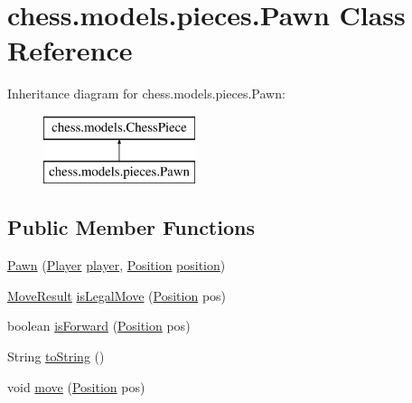 \hypertarget{classchess_1_1models_1_1pieces_1_1_pawn}{}\section{chess.\+models.\+pieces.\+Pawn Class Reference}
\label{classchess_1_1models_1_1pieces_1_1_pawn}
Inheritance diagram for chess.\+models.\+pieces.\+Pawn\+:\begin{figure}[H]
\begin{center}
\leavevmode
\includegraphics[height=2.000000cm]{classchess_1_1models_1_1pieces_1_1_pawn}
\end{center}
\end{figure}
\subsection*{Public Member Functions}
\begin{DoxyCompactItemize}
\item 
\mbox{\hyperlink{classchess_1_1models_1_1pieces_1_1_pawn_aa62632674360fd0518f583bf1477b8c1}{Pawn}} (\mbox{\hyperlink{enumchess_1_1models_1_1enums_1_1_player}{Player}} \mbox{\hyperlink{classchess_1_1models_1_1_chess_piece_a3bcc8a24667318b5aab8c146adcc3eb7}{player}}, \mbox{\hyperlink{classchess_1_1models_1_1_position}{Position}} \mbox{\hyperlink{classchess_1_1models_1_1_chess_piece_a0e4f8616b75e548f269d3971846396f3}{position}})
\item 
\mbox{\hyperlink{enumchess_1_1models_1_1enums_1_1_move_result}{Move\+Result}} \mbox{\hyperlink{classchess_1_1models_1_1pieces_1_1_pawn_ae293ed0d437de535ad14a543a1077871}{is\+Legal\+Move}} (\mbox{\hyperlink{classchess_1_1models_1_1_position}{Position}} pos)
\item 
boolean \mbox{\hyperlink{classchess_1_1models_1_1pieces_1_1_pawn_a80055e2b99a160f4de32644423460a6f}{is\+Forward}} (\mbox{\hyperlink{classchess_1_1models_1_1_position}{Position}} pos)
\item 
String \mbox{\hyperlink{classchess_1_1models_1_1pieces_1_1_pawn_a97538699aaa1cb69482ad9c218562450}{to\+String}} ()
\item 
void \mbox{\hyperlink{classchess_1_1models_1_1pieces_1_1_pawn_afb8291b2ab13822506cccad5dbe8fc91}{move}} (\mbox{\hyperlink{classchess_1_1models_1_1_position}{Position}} pos)
\end{DoxyCompactItemize}
